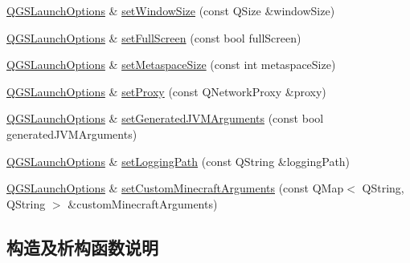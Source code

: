 \begin{DoxyCompactItemize}
\item 
\mbox{\hyperlink{class_q_g_s_launch_options}{Q\+G\+S\+Launch\+Options}} \& \mbox{\hyperlink{class_q_g_s_launch_options_a9210cdad666d5d65190ea56746eb770b}{set\+Window\+Size}} (const Q\+Size \&window\+Size)
\item 
\mbox{\hyperlink{class_q_g_s_launch_options}{Q\+G\+S\+Launch\+Options}} \& \mbox{\hyperlink{class_q_g_s_launch_options_a829e0bd53dd59cd4c5ef7a10b12d6205}{set\+Full\+Screen}} (const bool full\+Screen)
\item 
\mbox{\hyperlink{class_q_g_s_launch_options}{Q\+G\+S\+Launch\+Options}} \& \mbox{\hyperlink{class_q_g_s_launch_options_a1f06ff676048dd9a521543347a6a832b}{set\+Metaspace\+Size}} (const int metaspace\+Size)
\item 
\mbox{\hyperlink{class_q_g_s_launch_options}{Q\+G\+S\+Launch\+Options}} \& \mbox{\hyperlink{class_q_g_s_launch_options_abe63245317016695207797345f0cae14}{set\+Proxy}} (const Q\+Network\+Proxy \&proxy)
\item 
\mbox{\hyperlink{class_q_g_s_launch_options}{Q\+G\+S\+Launch\+Options}} \& \mbox{\hyperlink{class_q_g_s_launch_options_ae4b55c3850d27c75e3d60ce089ac3af7}{set\+Generated\+J\+V\+M\+Arguments}} (const bool generated\+J\+V\+M\+Arguments)
\item 
\mbox{\hyperlink{class_q_g_s_launch_options}{Q\+G\+S\+Launch\+Options}} \& \mbox{\hyperlink{class_q_g_s_launch_options_ae47661e30320c9ce657104590393148c}{set\+Logging\+Path}} (const Q\+String \&logging\+Path)
\item 
\mbox{\hyperlink{class_q_g_s_launch_options}{Q\+G\+S\+Launch\+Options}} \& \mbox{\hyperlink{class_q_g_s_launch_options_a4eb96356215746ae1bff3bcae689572b}{set\+Custom\+Minecraft\+Arguments}} (const Q\+Map$<$ Q\+String, Q\+String $>$ \&custom\+Minecraft\+Arguments)
\end{DoxyCompactItemize}


\subsection{构造及析构函数说明}
\mbox{\label{class_q_g_s_launch_options_a9c30f1914ab9eecfab92234b134c4191}} 
